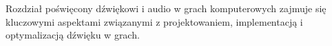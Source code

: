 Rozdział poświęcony dźwiękowi i audio w grach komputerowych zajmuje się kluczowymi aspektami związanymi z projektowaniem, implementacją i optymalizacją dźwięku w grach.